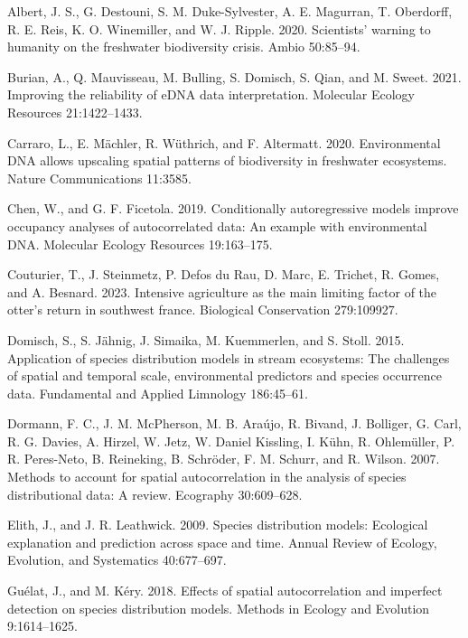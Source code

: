 \documentclass[
  11pt,
  a4paper,
]{article}
\newlength{\cslhangindent}
\newenvironment{CSLReferences}[2] %
 {\begin{list}{}{%
  \setlength{\itemindent}{0pt}
  \setlength{\leftmargin}{0pt}
  \setlength{\parsep}{0pt}
  \ifodd #1
   \setlength{\leftmargin}{\cslhangindent}
   \setlength{\itemindent}{-1\cslhangindent}
  \fi
  \setlength{\itemsep}{#2\baselineskip}}}
 {\end{list}}
\begin{document}
\label{refs}
\begin{CSLReferences}{1}{0}
Albert, J. S., G. Destouni, S. M. Duke-Sylvester, A. E. Magurran, T. Oberdorff, R. E. Reis, K. O. Winemiller, and W. J. Ripple. 2020. Scientists' warning to humanity on the freshwater biodiversity crisis. Ambio 50:85--94.

Burian, A., Q. Mauvisseau, M. Bulling, S. Domisch, S. Qian, and M. Sweet. 2021. Improving the reliability of eDNA data interpretation. Molecular Ecology Resources 21:1422--1433.

Carraro, L., E. Mächler, R. Wüthrich, and F. Altermatt. 2020. Environmental DNA allows upscaling spatial patterns of biodiversity in freshwater ecosystems. Nature Communications 11:3585.

Chen, W., and G. F. Ficetola. 2019. Conditionally autoregressive models improve occupancy analyses of autocorrelated data: An example with environmental DNA. Molecular Ecology Resources 19:163--175.

Couturier, T., J. Steinmetz, P. Defos du Rau, D. Marc, E. Trichet, R. Gomes, and A. Besnard. 2023. Intensive agriculture as the main limiting factor of the otter's return in southwest france. Biological Conservation 279:109927.

Domisch, S., S. Jähnig, J. Simaika, M. Kuemmerlen, and S. Stoll. 2015. Application of species distribution models in stream ecosystems: The challenges of spatial and temporal scale, environmental predictors and species occurrence data. Fundamental and Applied Limnology 186:45--61.

Dormann, F. C., J. M. McPherson, M. B. Araújo, R. Bivand, J. Bolliger, G. Carl, R. G. Davies, A. Hirzel, W. Jetz, W. Daniel Kissling, I. Kühn, R. Ohlemüller, P. R. Peres-Neto, B. Reineking, B. Schröder, F. M. Schurr, and R. Wilson. 2007. Methods to account for spatial autocorrelation in the analysis of species distributional data: A review. Ecography 30:609--628.

Elith, J., and J. R. Leathwick. 2009. Species distribution models: Ecological explanation and prediction across space and time. Annual Review of Ecology, Evolution, and Systematics 40:677--697.

Guélat, J., and M. Kéry. 2018. Effects of spatial autocorrelation and imperfect detection on species distribution models. Methods in Ecology and Evolution 9:1614--1625.


\end{CSLReferences}
\end{document}
